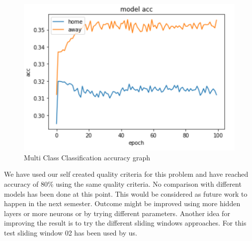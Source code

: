 \begin{figure}[H]
\begin{center}
\includegraphics[scale=1.5]{images/mccacc.PNG}
\end{center}
\caption{Multi Class Classification accuracy graph}
\label{mccacc}
\end{figure}

We have used our self created quality criteria for this problem and have reached accuracy of 80\% using the same quality criteria. No comparison with different models has been done at this point. This would be considered as future work to happen in the next semester. Outcome might be improved using more hidden layers or more neurons or by trying different parameters. Another idea for improving the result is to try the different sliding windows approaches. For this test sliding window 02 has been used by us. 


